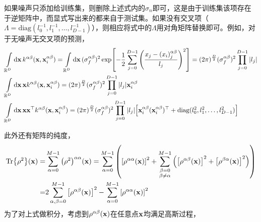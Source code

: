 \documentclass[12pt,UTF8]{article}
\begin{document}
            如果噪声只添加给训练集，则删除上述式内的$\sigma_n$即可，这是由于训练集该项存在于逆矩阵中，而显式写出来的都来自于测试集。如果没有交叉项（$\Lambda=\mathrm{diag}(l_0^{-1},l_1^{-1},\dots,l_{D-1}^{-1})$），则相应将式中的$\Lambda$用对角矩阵替换即可。例如，对于无噪声无交叉项的预测，
			\begin{align}
                &\int\limits_{\mathbb{R}^D}{\dd{\vb{x}}k^{\alpha\beta}(\vb{x},\vb{x}_i^{\alpha\beta})}=\int\limits_{\mathbb{R}^D}{\dd{\vb{x}}(\sigma_f^{\alpha\beta})^2\exp[-\frac{1}{2}\sum_{j=0}^{D-1}{\qty(\frac{x_j-(x_i)_j^{\alpha\beta}}{l_j})^2}]}=(2\pi)^{\frac{D}{2}}(\sigma_f^{\alpha\beta})^2\prod_{j=0}^{D-1}\abs{l_j} \\
                &\int\limits_{\mathbb{R}^D}{\dd{\vb{x}}\vb{x}k^{\alpha\beta}(\vb{x},\vb{x}_i^{\alpha\beta})}=(2\pi)^{\frac{D}{2}}(\sigma_f^{\alpha\beta})^2\prod_{j=0}^{D-1}\abs{l_j}\vb{x}_i^{\alpha\beta} \\
                &\int\limits_{\mathbb{R}^D}{\dd{\vb{x}}\vb{x}\vb{x}^\top k^{\alpha\beta}(\vb{x},\vb{x}_i^{\alpha\beta})}=(2\pi)^{\frac{D}{2}}(\sigma_f^{\alpha\beta})^2\prod_{j=0}^{D-1}\abs{l_j}\qty[\vb{x}_i^{\alpha\beta}(\vb{x}_i^{\alpha\beta})^\top+\mathrm{diag}(l_0^2,l_1^2,\dots,l_{D-1}^2)] \\
            \end{align}\par
            此外还有矩阵的纯度，
            \begin{align}
                \Tr{\rho^2}(\vb{x})=&\sum_{\alpha=0}^{M-1}{\qty(\rho^2)^{\alpha\alpha}(\vb{x})}=\sum_{\alpha=0}^{M-1}{\qty(\qty[\rho^{\alpha\alpha}(\vb{x})]^2+\sum_{\substack{\beta=0\\\beta\neq\alpha}}^{M-1}{\qty(\qty[\rho^{\alpha\beta}(\vb{x})]^2+\qty[\rho^{\beta\alpha}(\vb{x})]^2)})} \\
                =&2\sum_{\alpha,\beta=0}^{M-1}{\qty[\rho^{\alpha\beta}(\vb{x})]^2}-\sum_{\alpha=0}^{M-1}{\qty[\rho^{\alpha\alpha}(\vb{x})]^2}
            \end{align}
            为了对上式做积分，考虑到$\rho^{\alpha\beta}(\vb{x})$在任意点$\vb{x}$均满足高斯过程，
\end{document}
